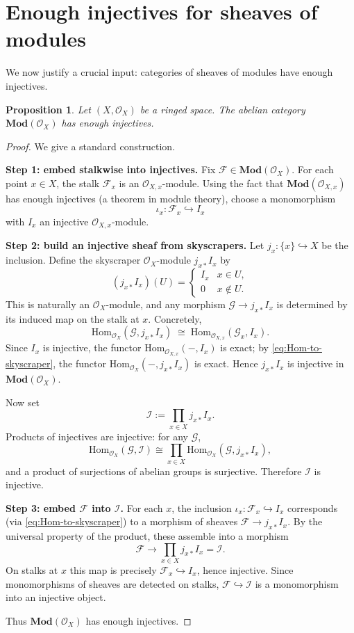 \documentclass[11pt]{article}
\theoremstyle{definition}
\theoremstyle{plain}
\newtheorem{proposition}[definition]{Proposition}
\newcommand{\Mod}{\mathbf{Mod}}
\newcommand{\Hom}{\mathrm{Hom}}
\newcommand{\OO}{\mathcal{O}}
\begin{document}
\section{Enough injectives for sheaves of modules}

We now justify a crucial input: categories of sheaves of modules have enough injectives.

\begin{proposition}\label{prop:enough-inj-modOX}
Let $(X,\OO_X)$ be a ringed space. The abelian category $\Mod(\OO_X)$ has enough injectives.
\end{proposition}

\begin{proof}
We give a standard construction.

\medskip
\noindent\textbf{Step 1: embed stalkwise into injectives.}
Fix $\mathcal{F}\in\Mod(\OO_X)$.
For each point $x\in X$, the stalk $\mathcal{F}_x$ is an $\OO_{X,x}$-module.
Using the fact that $\Mod(\OO_{X,x})$ has enough injectives (a theorem in module theory), choose a monomorphism
\[
\iota_x:\mathcal{F}_x \hookrightarrow I_x
\]
with $I_x$ an injective $\OO_{X,x}$-module.

\medskip
\noindent\textbf{Step 2: build an injective sheaf from skyscrapers.}
Let $j_x:\{x\}\hookrightarrow X$ be the inclusion. Define the skyscraper $\OO_X$-module $j_{x*}I_x$ by
\[
(j_{x*}I_x)(U)=
\begin{cases}
I_x & x\in U,\\
0 & x\notin U.
\end{cases}
\]
This is naturally an $\OO_X$-module, and any morphism $\mathcal{G}\to j_{x*}I_x$ is determined by its induced map on the stalk at $x$. Concretely,
\begin{equation}\label{eq:Hom-to-skyscraper}
\Hom_{\OO_X}(\mathcal{G},j_{x*}I_x)\;\cong\;\Hom_{\OO_{X,x}}(\mathcal{G}_x,I_x).
\end{equation}
Since $I_x$ is injective, the functor $\Hom_{\OO_{X,x}}(-,I_x)$ is exact; by \eqref{eq:Hom-to-skyscraper}, the functor $\Hom_{\OO_X}(-,j_{x*}I_x)$ is exact. Hence $j_{x*}I_x$ is injective in $\Mod(\OO_X)$.

Now set
\[
\mathcal{I}:=\prod_{x\in X} j_{x*}I_x.
\]
Products of injectives are injective: for any $\mathcal{G}$,
\[
\Hom_{\OO_X}(\mathcal{G},\mathcal{I})
\cong \prod_{x\in X}\Hom_{\OO_X}(\mathcal{G},j_{x*}I_x),
\]
and a product of surjections of abelian groups is surjective. Therefore $\mathcal{I}$ is injective.

\medskip
\noindent\textbf{Step 3: embed $\mathcal{F}$ into $\mathcal{I}$.}
For each $x$, the inclusion $\iota_x:\mathcal{F}_x\hookrightarrow I_x$ corresponds (via \eqref{eq:Hom-to-skyscraper}) to a morphism of sheaves $\mathcal{F}\to j_{x*}I_x$.
By the universal property of the product, these assemble into a morphism
\[
\mathcal{F}\longrightarrow \prod_{x\in X} j_{x*}I_x=\mathcal{I}.
\]
On stalks at $x$ this map is precisely $\mathcal{F}_x\hookrightarrow I_x$, hence injective. Since monomorphisms of sheaves are detected on stalks, $\mathcal{F}\hookrightarrow \mathcal{I}$ is a monomorphism into an injective object.

Thus $\Mod(\OO_X)$ has enough injectives.
\end{proof}
\end{document}
